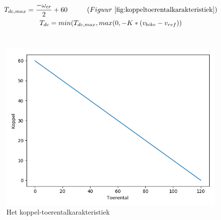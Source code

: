 \begin{gather*}
T_{dc,max} = \frac{-\omega_{cr}}{2}+60 \tab (Figuur\ \ref{fig:koppeltoerentalkarakteristiek}) \\
T_{dc} = min(T_{dc,max},max(0,-K*(v_{bike}-v_{ref}))
\end{gather*}
\\
\begin{figure}
  \includegraphics[width=\linewidth]{images/koppel-toerentalkarakteristiek.png}
  \caption{Het koppel-toerentalkarakteristiek}
  \label{fig:koppeltoerentalkarakteristiek}
\end{figure}

